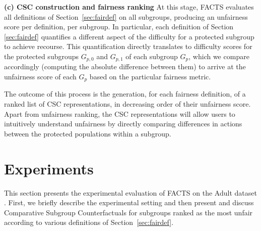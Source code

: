\documentclass{article}
\begin{document}
\smallskip\noindent\textbf{(c) CSC construction and fairness ranking}  At this stage, FACTS evaluates all definitions of Section~\ref{sec:fairdef} on all subgroups, producing an unfairness score per definition, per subgroup. 
In particular, each definition of Section \ref{sec:fairdef} quantifies a different aspect of the difficulty for a protected subgroup to achieve recourse. This quantification directly translates to difficulty scores for the protected subgroups $G_{p,0}$ and $G_{p,1}$ of each subgroup $G_p$, which we compare accordingly (computing the absolute difference between them) to arrive at the unfairness score of each $G_p$ based on the particular fairness metric.

The outcome of this process is the generation, for each fairness definition, of a ranked list of CSC representations, in decreasing order of their unfairness score. Apart from unfairness ranking, the CSC representations will allow users to intuitively understand unfairness by directly comparing differences in actions between the protected populations within a subgroup.





% 

\section{Experiments}\label{sec-experiments}

This section presents the experimental evaluation of FACTS on the Adult dataset \cite{Bache+Lichman:2013}. First, we briefly describe the experimental setting and then present and discuss Comparative Subgroup Counterfactuals for subgroups ranked as the most unfair according to various definitions of Section~\ref{sec:fairdef}.
\end{document}
